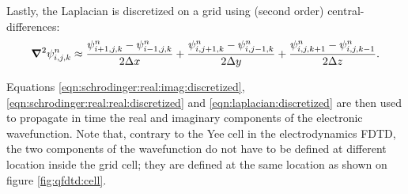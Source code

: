 Lastly, the Laplacian is discretized on a grid using (second order)
central-differences:
\begin{align}
\bm{\nabla}^2 \psi_{i,j,k}^{n} \approx
      \frac{ \psi_{i+1,j,k}^{n} - \psi_{i-1,j,k}^{n} }{2 \Delta x}
    + \frac{ \psi_{i,j+1,k}^{n} - \psi_{i,j-1,k}^{n} }{2 \Delta y}
    + \frac{ \psi_{i,j,k+1}^{n} - \psi_{i,j,k-1}^{n} }{2 \Delta z}.
\label{eqn:laplacian:discretized}
\end{align}

Equations \eqref{eqn:schrodinger:real:imag:discretized},
\eqref{eqn:schrodinger:real:real:discretized} and
\eqref{eqn:laplacian:discretized} are then used to propagate in time the real
and imaginary components of the electronic wavefunction. Note that, contrary
to the Yee cell in the electrodynamics FDTD, the two components of the
wavefunction do not have to be defined at different location inside the grid
cell; they are defined at the same location as shown on figure
\ref{fig:qfdtd:cell}.

